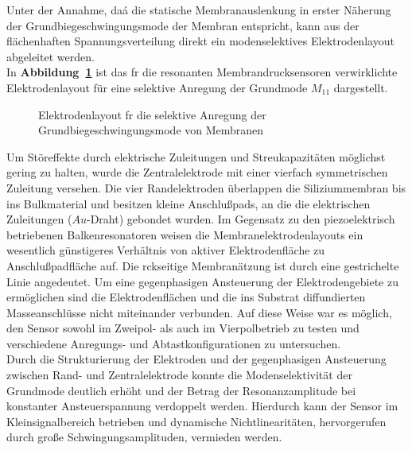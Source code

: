 Unter der Annahme, daá die statische Membranauslenkung in erster Näherung
der Grundbiegeschwingungsmode der Membran entspricht, kann aus der
flächenhaften Spannungsverteilung direkt ein modenselektives Elektrodenlayout
abgeleitet werden. \\
In {\bf Abbildung~\ref{abbmembraneleklayout}}
ist das fr die resonanten Membrandrucksensoren verwirklichte
Elektrodenlayout für eine selektive Anregung der Grundmode $M_{11}$
dargestellt.
\begin{figure}[htb]

\begin{center}

\setabbfas
\end{center}

\caption{\label{abbmembraneleklayout}
 Elektrodenlayout fr die selektive Anregung der
 Grund\-biege\-schwin\-gungs\-mode von Membranen}
\end{figure}
Um Störeffekte durch elektrische Zuleitungen und Streukapazitäten
möglichst gering zu halten, wurde die Zentralelektrode mit einer
vierfach symmetrischen Zuleitung versehen. Die vier Randelektroden
überlappen die Siliziummembran bis ins Bulkmaterial und besitzen kleine
Anschlußpads, an die die elektrischen Zuleitungen ($Au$-Draht) gebondet
wurden.
Im Gegensatz zu den piezoelektrisch betriebenen Balkenresonatoren weisen die
Membranelektrodenlayouts ein wesentlich günstigeres Verhältnis von aktiver
Elektrodenfläche zu Anschlußpadfläche auf.
Die rckseitige Membranätzung ist durch eine gestrichelte Linie angedeutet.
Um eine gegenphasigen Ansteuerung der Elektrodengebiete zu ermöglichen sind
die Elektrodenflächen und die ins Substrat diffundierten Masseanschlüsse
nicht miteinander verbunden. Auf diese Weise war es möglich, den Sensor
sowohl im Zweipol- als auch im Vierpolbetrieb zu testen und verschiedene
Anregungs- und Abtastkonfigurationen zu untersuchen.\\
%
Durch die Strukturierung der Elektroden und der gegenphasigen Ansteuerung
zwischen Rand- und Zentralelektrode konnte die Modenselektivität
der Grundmode deutlich erhöht und der Betrag der Resonanzamplitude bei
konstanter Ansteuerspannung verdoppelt werden. Hierdurch kann der Sensor im
Kleinsignalbereich betrieben und dynamische Nichtlinearitäten,
hervorgerufen durch große Schwingungsamplituden, vermieden
werden.\\
